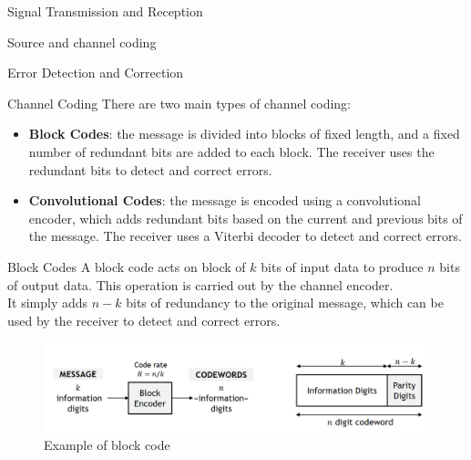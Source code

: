 \begin{section}{Signal Transmission and Reception}
\begin{section}{Source and channel coding}
\begin{subsection}{Error Detection and Correction}
\begin{subsubsection}{Channel Coding}
        There are two main types of channel coding:
        \begin{itemize}
          \item \textbf{Block Codes}: the message is divided into blocks of fixed length, and a 
            fixed number of redundant bits are added to each block. The receiver uses the redundant
            bits to detect and correct errors.
          \item \textbf{Convolutional Codes}: the message is encoded using a convolutional encoder,
            which adds redundant bits based on the current and previous bits of the message. The 
            receiver uses a Viterbi decoder to detect and correct errors.
        \end{itemize}
      \end{subsubsection}
      \begin{subsubsection}{Block Codes}
        A block code acts on block of $k$ bits of input data to produce $n$ bits of output data.
        This operation is carried out by the channel encoder.\\
        It simply adds $n-k$ bits of redundancy to the original message, which can be used by the
        receiver to detect and correct errors.\\

        \begin{figure}[h]
          \centering
          \includegraphics[width=\textwidth]{img/wireless/block codes.png}
          \caption{Example of block code}
          \label{fig:block code}
        \end{figure}
      \end{subsubsection}
    \end{subsection}
  \end{section}
\end{section}
